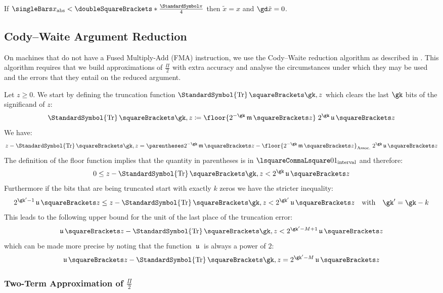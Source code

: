 \documentclass[10pt, a4paper, twoside]{basestyle}
\DeclareMathOperator{\ULP}{\mathfrak u}
\DeclareMathOperator{\mant}{\mathfrak m}
\DeclareMathOperator{\truncate}{\StandardSymbol{Tr}}
\newcommand{\round}[1]{\doubleSquareBrackets*{#1}}
\newcommand{\red}[1]{\tilde{#1}}
\begin{document}
If $\abs x < \round{\frac{\Pi}{4}}$ then $\red x = x$ and $\gd \red x = 0$.

\subsection*{Cody--Waite Argument Reduction}

On machines that do not have a Fused Multiply-Add (FMA) instruction, we use the Cody--Waite reduction algorithm as described in \cite[379-381]{MullerBrisebarreDeDinechinJeannerodLefevreMelquiondRevolStehleTorres2010}.  This algorithm requires that we build approximations of $\frac{\Pi}{2}$ with extra accuracy and analyse the circumstances under which they may be used and the errors that they entail on the reduced argument.

Let $z \geq 0$.  We start by defining the truncation function $\truncate\of{\gk, z}$ which clears the last $\gk$ bits of the significand of $z$:
\[
\truncate\of{\gk, z} \DefineAs \floor{2^{-\gk} \mant \of{z}} \; 2^{\gk} \ULP\of{z}
\]
We have:
\[
z - \truncate\of{\gk, z} = \pa{2^{-\gk} \mant \of{z} - \floor{2^{-\gk} \mant \of{z}}} \; 2^{\gk} \ULP\of{z}
\]
The definition of the floor function implies that the quantity in parentheses is in $\intclop 0 1$ and therefore:
\[
0 \leq z - \truncate\of{\gk, z} < 2^{\gk} \ULP\of{z}
\]
Furthermore if the bits that are being truncated start with exactly $k$ zeros we have the stricter inequality:
\begin{equation}
2^{\gk' - 1} \ULP\of{z} \leq z - \truncate\of{\gk, z} < 2^{\gk'} \ULP\of{z} \quad \text{with} \quad \gk' = \gk - k
\label{eqntruncerror}
\end{equation}
This leads to the following upper bound for the unit of the last place of the truncation error:
\[
\ULP\of{z - \truncate\of{\gk, z}} < 2^{\gk' - M + 1} \ULP\of{z}
\]
which can be made more precise by noting that the function $\ULP$ is always a power of $2$:
\begin{equation}
\ULP\of{z - \truncate\of{\gk, z}} = 2^{\gk' - M} \ULP\of{z}
\label{eqnulptr}
\end{equation}

\subsubsection*{Two-Term Approximation of $\frac{\Pi}{2}$}
\end{document}
